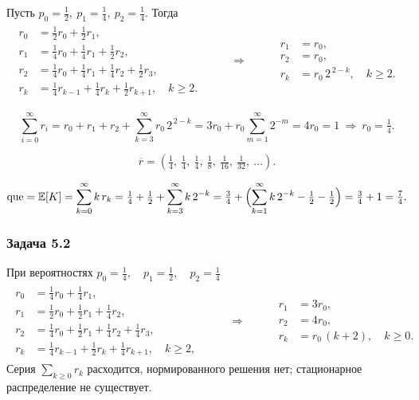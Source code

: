 Пусть $p_0=\tfrac{1}{2},\ p_1=\tfrac{1}{4},\ p_2=\tfrac{1}{4}$. Тогда
\[
	\begin{array}{rcl}
		\begin{aligned}
			r_0 & = \tfrac{1}{2} r_0 + \tfrac{1}{2} r_1,                                           \\
			r_1 & = \tfrac{1}{4} r_0 + \tfrac{1}{4} r_1 + \tfrac{1}{2} r_2,                        \\
			r_2 & = \tfrac{1}{4} r_0 + \tfrac{1}{4} r_1 + \tfrac{1}{4} r_2 + \tfrac{1}{2} r_3,     \\
			r_k & = \tfrac{1}{4} r_{k-1} + \tfrac{1}{4} r_k + \tfrac{1}{2} r_{k+1}, \quad k \ge 2.
		\end{aligned}
		 & \qquad \Rightarrow \qquad &
		\begin{aligned}
			r_1 & = r_0,                         \\
			r_2 & = r_0,                         \\
			r_k & = r_0\,2^{\,2-k},\quad k\ge 2.
		\end{aligned}
	\end{array}
\]

\[
	\sum_{i=0}^\infty r_i = r_0+r_1+r_2+\sum_{k=3}^\infty r_0\,2^{\,2-k}
	=3r_0+r_0\!\sum_{m=1}^\infty 2^{-m}=4r_0=1
	\ \Rightarrow\ r_0=\tfrac14.
\]


\[
	\overline r = \left(\tfrac{1}{4},\ \tfrac{1}{4},\ \tfrac{1}{4},\ \tfrac{1}{8},\ \tfrac{1}{16},\ \tfrac{1}{32},\ \ldots\right).
\]

\[
	\mathrm{que}=\mathbb E[K]=\sum_{k=0}^\infty k\,r_k
	=\tfrac14+\tfrac12+\sum_{k=3}^\infty k\,2^{-k}
	=\tfrac34+\Bigl(\sum_{k=1}^\infty k\,2^{-k}-\tfrac12-\tfrac12\Bigr)
	=\tfrac34+1=\tfrac{7}{4}.
\]

\subsubsection*{Задача 5.2}

При вероятностях $p_0=\tfrac{1}{4},\quad p_1=\tfrac{1}{2},\quad p_2=\tfrac{1}{4}$
\[
	\begin{array}{rcl}
		\begin{aligned}
			r_0 & = \tfrac{1}{4} r_0 + \tfrac{1}{4} r_1,                                           \\
			r_1 & = \tfrac{1}{2} r_0 + \tfrac{1}{2} r_1 + \tfrac{1}{4} r_2,                        \\
			r_2 & = \tfrac{1}{4} r_0 + \tfrac{1}{2} r_1 + \tfrac{1}{4} r_2 + \tfrac{1}{4} r_3,     \\
			r_k & = \tfrac{1}{4} r_{k-1} + \tfrac{1}{2} r_k + \tfrac{1}{4} r_{k+1}, \quad k \ge 2,
		\end{aligned}
		 & \qquad \Rightarrow \qquad &
		\begin{aligned}
			r_1 & = 3r_0,                    \\
			r_2 & = 4r_0,                    \\
			r_k & = r_0\,(k+2),\quad k\ge 0.
		\end{aligned}
	\end{array}
\]
Серия \(\sum_{k\ge0} r_k\) расходится, нормированного решения нет; стационарное распределение не существует.


